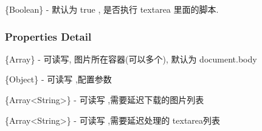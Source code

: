 \documentclass[letterpaper,10pt,english]{sphinxmanual}
\begin{document}
\begin{fulllineitems}
\label{api/component/datalazyload/index:DataLazyload.execScript}
\{Boolean\} - 默认为 true , 是否执行 textarea 里面的脚本.

\end{fulllineitems}



\subsubsection{Properties Detail}
\label{api/component/datalazyload/index:properties-detail}

\begin{fulllineitems}
\label{api/component/datalazyload/index:DataLazyload.containers}
\{Array\} - 可读写, 图片所在容器(可以多个), 默认为 document.body

\end{fulllineitems}



\begin{fulllineitems}
\label{api/component/datalazyload/index:DataLazyload.config}
\{Object\} - 可读写 ,配置参数

\end{fulllineitems}



\begin{fulllineitems}
\label{api/component/datalazyload/index:DataLazyload.images}
\{Array\textless{}String\textgreater{}\} - 可读写 ,需要延迟下载的图片列表

\end{fulllineitems}



\begin{fulllineitems}
\label{api/component/datalazyload/index:DataLazyload.areaes}
\{Array\textless{}String\textgreater{}\} - 可读写 ,需要延迟处理的 textarea列表

\end{fulllineitems}


\end{document}
